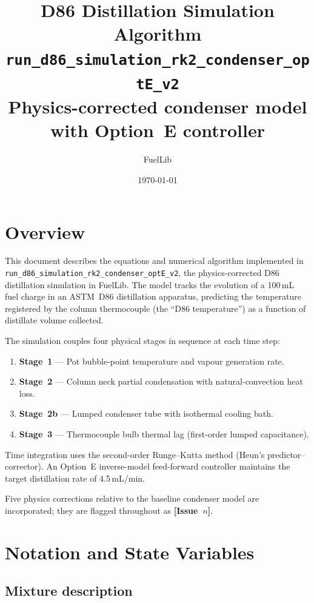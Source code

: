 \documentclass[11pt,letterpaper]{article}
\title{\textbf{D86 Distillation Simulation Algorithm}\\[0.5em]
\large \texttt{run\_d86\_simulation\_rk2\_condenser\_optE\_v2}\\[0.3em]
\normalsize Physics-corrected condenser model with Option~E controller}
\author{FuelLib}
\date{\today}
\begin{document}
\maketitle
\tableofcontents
\newpage

\section{Overview}
\label{sec:overview}

This document describes the equations and numerical algorithm implemented in
\texttt{run\_d86\_simulation\_rk2\_condenser\_optE\_v2}, the physics-corrected
D86 distillation simulation in FuelLib.  The model tracks the evolution of a
100\,mL fuel charge in an ASTM~D86 distillation apparatus, predicting the
temperature registered by the column thermocouple (the ``D86 temperature'')
as a function of distillate volume collected.

The simulation couples four physical stages in sequence at each time step:

\begin{enumerate}[nosep]
  \item \textbf{Stage~1} — Pot bubble-point temperature and vapour generation rate.
  \item \textbf{Stage~2} — Column neck partial condensation with natural-convection heat loss.
  \item \textbf{Stage~2b} — Lumped condenser tube with isothermal cooling bath.
  \item \textbf{Stage~3} — Thermocouple bulb thermal lag (first-order lumped capacitance).
\end{enumerate}

Time integration uses the second-order Runge--Kutta method (Heun's predictor--corrector).
An Option~E inverse-model feed-forward controller maintains the target distillation
rate of 4.5\,mL/min.

Five physics corrections relative to the baseline condenser model are incorporated;
they are flagged throughout as \textbf{[Issue~$n$]}.

\section{Notation and State Variables}
\label{sec:notation}

\subsection{Mixture description}
\end{document}
